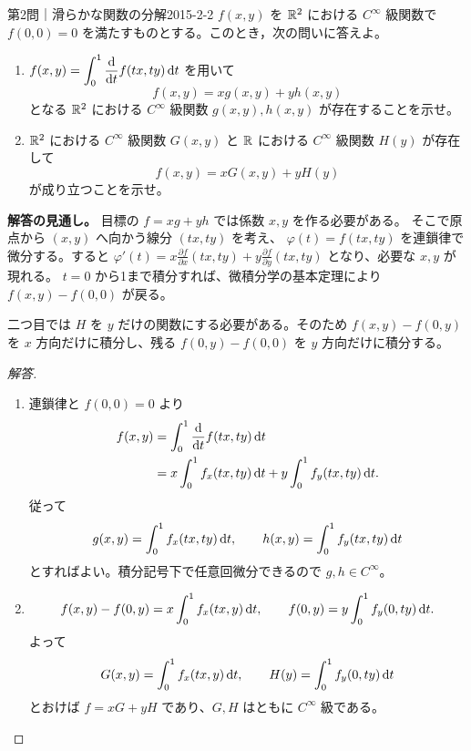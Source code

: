 \begin{problem}{第2問｜滑らかな関数の分解}{2015-2-2}
$f(x,y)$ を $\mathbb{R}^2$ における $C^\infty$ 級関数で $f(0,0)=0$ を満たすものとする。このとき，次の問いに答えよ。
\begin{enumerate}
  \item[(1)] $f(x,y)=\displaystyle\int_0^1\frac{\mathrm{d}}{\mathrm{d} t}f(tx,ty)\,\mathrm{d} t$ を用いて
  \[
  f(x,y)=xg(x,y)+yh(x,y)
  \]
  となる $\mathbb{R}^2$ における $C^\infty$ 級関数 $g(x,y),h(x,y)$ が存在することを示せ。
  \item[(2)] $\mathbb{R}^2$ における $C^\infty$ 級関数 $G(x,y)$ と $\mathbb{R}$ における $C^\infty$ 級関数 $H(y)$ が存在して
  \[
  f(x,y)=xG(x,y)+yH(y)
  \]
  が成り立つことを示せ。
\end{enumerate}
\end{problem}
\begin{memo*}
\textbf{解答の見通し。}
目標の $f=xg+yh$ では係数 $x,y$ を作る必要がある。
そこで原点から $(x,y)$ へ向かう線分 $(tx,ty)$ を考え、
$\varphi(t)=f(tx,ty)$ を連鎖律で微分する。すると
$\varphi'(t)=x\frac{\partial f}{\partial x}(tx,ty)+y\frac{\partial f}{\partial y}(tx,ty)$ となり、必要な $x,y$ が現れる。
$t=0$ から1まで積分すれば、微積分学の基本定理により $f(x,y)-f(0,0)$ が戻る。

二つ目では $H$ を $y$ だけの関数にする必要がある。そのため
$f(x,y)-f(0,y)$ を $x$ 方向だけに積分し、残る $f(0,y)-f(0,0)$ を
$y$ 方向だけに積分する。
\end{memo*}
\begin{proof}[解答]
\begin{enumerate}
  \item[(1)] 連鎖律と $f(0,0)=0$ より
  \begin{align*}
  f(x,y)
  &=\int_0^1\frac{\mathrm{d}}{\mathrm{d} t}f(tx,ty)\,\mathrm{d} t\\
  &=x\int_0^1f_x(tx,ty)\,\mathrm{d} t
   +y\int_0^1f_y(tx,ty)\,\mathrm{d} t.
  \end{align*}
  従って
  \[
  g(x,y)=\int_0^1f_x(tx,ty)\,\mathrm{d} t,\qquad
  h(x,y)=\int_0^1f_y(tx,ty)\,\mathrm{d} t
  \]
  とすればよい。積分記号下で任意回微分できるので $g,h\in C^\infty$。

  \item[(2)]
  \[
  f(x,y)-f(0,y)=x\int_0^1f_x(tx,y)\,\mathrm{d} t,\qquad
  f(0,y)=y\int_0^1f_y(0,ty)\,\mathrm{d} t.
  \]
  よって
  \[
  G(x,y)=\int_0^1f_x(tx,y)\,\mathrm{d} t,\qquad
  H(y)=\int_0^1f_y(0,ty)\,\mathrm{d} t
  \]
  とおけば $f=xG+yH$ であり、$G,H$ はともに $C^\infty$ 級である。
\end{enumerate}
\end{proof}

